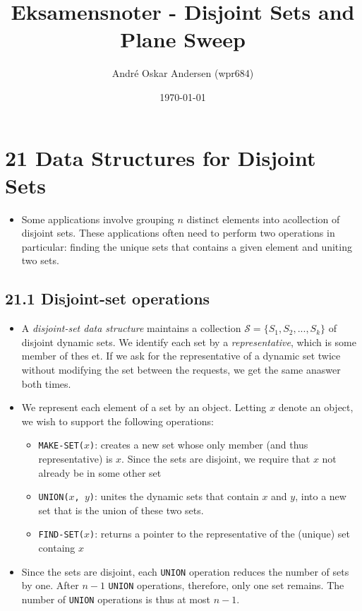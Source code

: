 \documentclass{report}
\title{Eksamensnoter - Disjoint Sets and Plane Sweep}
\author{André Oskar Andersen (wpr684)}
\date{\today}
\begin{document}
\maketitle

\section*{21 Data Structures for Disjoint Sets}
\begin{itemize}
    \item Some applications involve grouping $n$ distinct elements into acollection of disjoint sets. These applications often need to perform two operations in particular: finding the unique sets that contains a given element and uniting two sets.
\end{itemize}

\subsection*{21.1 Disjoint-set operations}
\begin{itemize}
    \item A \textit{disjoint-set data structure} maintains a collection $\mathcal{S} = \{S_1, S_2, ..., S_k\}$ of disjoint dynamic sets. We identify each set by a \textit{representative}, which is some member of thes et. If we ask for the representative of a dynamic set twice without modifying the set between the requests, we get the same anaswer both times.
    \item We represent each element of a set by an object. Letting $x$ denote an object, we wish to support the following operations:
    \begin{itemize}
        \item \texttt{MAKE-SET($x$)}: creates a new set whose only member (and thus representative) is $x$. Since the sets are disjoint, we require that $x$ not already be in some other set
        \item \texttt{UNION($x$, $y$)}: unites the dynamic sets that contain $x$ and $y$, into a new set that is the union of these two sets.
        \item \texttt{FIND-SET($x$)}: returns a pointer to the representative of the (unique) set containg $x$
    \end{itemize}
    \item Since the sets are disjoint, each \texttt{UNION} operation reduces the number of sets by one. After $n - 1$ \texttt{UNION} operations, therefore, only one set remains. The number of \texttt{UNION} operations is thus at most $n - 1$.
\end{itemize}
\end{document}

